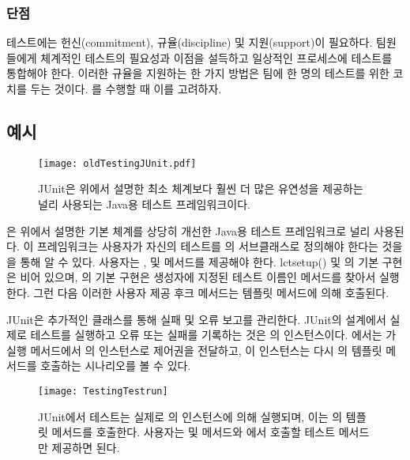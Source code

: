 \documentclass[a4paper,10pt,twoside]{book}
\begin{document}
\subsubsection*{단점}

\begin{bulletlist}
\item  테스트에는 헌신(commitment), 규율(discipline) 및 지원(support)이 필요하다. 팀원들에게 체계적인 테스트의 필요성과 이점을 설득하고 일상적인 프로세스에 테스트를 통합해야 한다. 이러한 규율을 지원하는 한 가지 방법은 팀에 한 명의 테스트를 위한 코치를 두는 것이다. 를 수행할 때 이를 고려하자.
\end{bulletlist}

\subsection*{예시}

\begin{figure}[tb]
\begin{center}
\texttt{[image: oldTestingJUnit.pdf]}
\caption{JUnit은 위에서 설명한 최소 체계보다 훨씬 더 많은 유연성을 제공하는 널리 사용되는 Java용 테스트 프레임워크이다.}
\end{center}
\end{figure}

은 위에서 설명한 기본 체계를 상당히 개선한 Java용 테스트 프레임워크로 널리 사용된다. 이 프레임워크는 사용자가 자신의 테스트를 의 서브클래스로 정의해야 한다는 것을 을 통해 알 수 있다. 사용자는 ,  및  메서드를 제공해야 한다. lct{setup()} 및 의 기본 구현은 비어 있으며, 의 기본 구현은 생성자에 지정된 테스트 이름인 메서드를 찾아서 실행한다. 그런 다음 이러한 사용자 제공 후크 메서드는  템플릿 메서드에 의해 호출된다.

JUnit은 추가적인  클래스를 통해 실패 및 오류 보고를 관리한다. JUnit의 설계에서 실제로 테스트를 실행하고 오류 또는 실패를 기록하는 것은 의 인스턴스이다. 에서는 가 실행 메서드에서 의 인스턴스로 제어권을 전달하고, 이 인스턴스는 다시 의  템플릿 메서드를 호출하는 시나리오를 볼 수 있다.

\begin{figure}[tb]
\begin{center}
\texttt{[image: TestingTestrun]}
\caption{JUnit에서 테스트는 실제로 의 인스턴스에 의해 실행되며, 이는 의  템플릿 메서드를 호출한다. 사용자는  및  메서드와 에서 호출할 테스트 메서드만 제공하면 된다.}
\end{center}
\end{figure}
\end{document}

